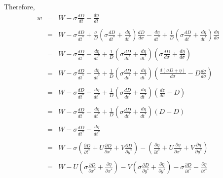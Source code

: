 \documentclass[oribibl]{llncs}
\begin{document}
Therefore, 
\begin{eqnarray}  
w &=& W - \sigma \frac{dD}{dt} - \frac{d \eta}{d t} \nonumber \\ \nonumber \\
    &=& W - \sigma \frac{dD}{dt^*} +\frac{\sigma}{D}  \left( \sigma \frac{dD}{dt^*} +\frac{d \eta}{dt^*} \right) \frac{d D}{d \sigma}  - \frac{d\eta}{dt^*}  +\frac{1}{D} \left( \sigma \frac{dD}{dt^*} +\frac{d \eta}{dt^*} \right) \frac{d \eta}{d \sigma} \nonumber \\ \nonumber \\
    &=& W - \sigma \frac{dD}{dt^*} - \frac{d \eta}{d t^*}+  \frac{1}{D} \left( \sigma \frac{dD}{dt^*} +\frac{d \eta}{dt^*} \right)  \left( \sigma \frac{dD}{d\sigma} + \frac{d\eta}{d\sigma}\right)\nonumber \\ \nonumber \\
     &=& W - \sigma \frac{dD}{dt^*} - \frac{d \eta}{d t^*}+  \frac{1}{D} \left( \sigma \frac{dD}{dt^*} +\frac{d \eta}{dt^*} \right)  \left(\frac{d (\sigma D+\eta)}{d\sigma} -D \frac{d\sigma}{d\sigma}\right)\nonumber \\ \nonumber \\
     &=& W - \sigma \frac{dD}{dt^*} - \frac{d \eta}{d t^*}+  \frac{1}{D} \left( \sigma \frac{dD}{dt^*} +\frac{d \eta}{dt^*} \right)  \left(\frac{dz}{d\sigma} -D \right)\nonumber \\ \nonumber \\
     &=& W - \sigma \frac{dD}{dt^*} - \frac{d \eta}{d t^*}+  \frac{1}{D} \left( \sigma \frac{dD}{dt^*} +\frac{d \eta}{dt^*} \right)  \left(D -D \right)\nonumber \\ \nonumber \\     
     &=& W - \sigma \frac{dD}{dt^*} - \frac{d \eta}{d t^*} \nonumber \\ \nonumber \\  
     &=& W - \sigma \left( \frac{\partial D}{\partial t^*} + U\frac{\partial D}{\partial x^*}+V\frac{\partial D}{\partial y^*} \right) -\left( \frac{\partial \eta}{\partial t^*} + U\frac{\partial \eta}{\partial x^*}+V\frac{\partial \eta}{\partial y^*} \right) \nonumber \\ \nonumber \\  
     &=& W -  U\left( \sigma\frac{\partial D}{\partial x^*} +\frac{\partial \eta}{\partial x^*} \right) -V \left(\sigma \frac{\partial D}{\partial y^*}+\frac{\partial \eta}{\partial y^*} \right) -\sigma \frac{\partial D}{\partial t^*} - \frac{\partial \eta}{\partial t^*}
\end{eqnarray}  
\end{document}
